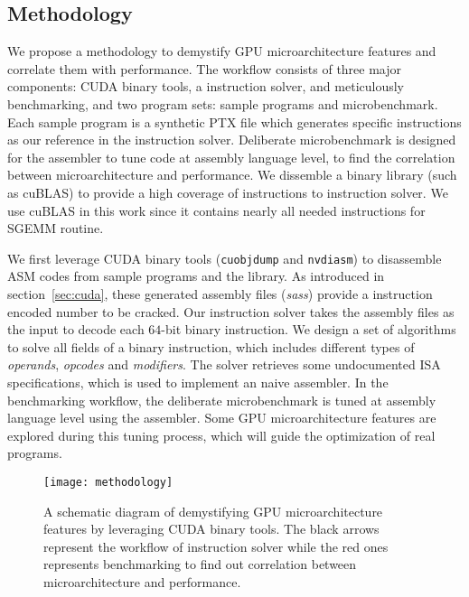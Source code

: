 \subsection{Methodology}


We propose a methodology to demystify GPU microarchitecture features and correlate them with performance.
The workflow consists of three major components: CUDA binary tools, a instruction solver, and meticulously benchmarking, and two program sets: sample programs and microbenchmark.
Each sample program is a synthetic PTX file which generates specific instructions as our reference in the instruction solver. 
Deliberate microbenchmark is designed for the assembler to tune code at assembly language level, to find the correlation between microarchitecture and performance.
We dissemble a binary library (such as cuBLAS) to provide a high coverage of instructions to instruction solver.
We use cuBLAS in this work since it contains nearly all needed instructions for SGEMM routine.

We first leverage CUDA binary tools ({\tt cuobjdump} and {\tt nvdiasm}) to disassemble ASM codes from sample programs and the library.
As introduced in section~\ref{sec:cuda}, these generated assembly files ({\em sass}) provide a instruction encoded number to be cracked.
Our instruction solver takes the assembly files as the input to decode each $64$-bit binary instruction.
We design a set of algorithms to solve all fields of a binary instruction, which includes different types of {\em operands}, {\em opcodes} and {\em modifiers}.
The solver retrieves  some undocumented ISA specifications, which is used to implement an naive assembler.
In the benchmarking workflow, the deliberate microbenchmark is tuned at assembly language level using the assembler.
Some GPU microarchitecture features are explored during this tuning process, which will guide the optimization of real programs.


\begin{figure}[htbp]
\begin{center}
\texttt{[image: methodology]}
\caption{A schematic diagram of demystifying GPU microarchitecture features by leveraging CUDA binary tools. The black arrows
represent the workflow of instruction solver while the red ones represents benchmarking to find out correlation between microarchitecture
and performance.}
\label{fig:workflow}
\end{center}
\end{figure}


